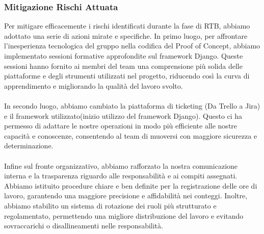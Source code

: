 \documentclass[5pt]{article}
\begin{document}
    \subsubsection{Mitigazione Rischi Attuata}
Per mitigare efficacemente i rischi identificati durante la fase di RTB, abbiamo adottato una serie di azioni mirate e specifiche. In primo luogo, per affrontare l'inesperienza tecnologica del gruppo nella codifica del Proof of Concept, abbiamo implementato sessioni formative approfondite sul framework Django. Queste sessioni hanno fornito ai membri del team una comprensione più solida delle piattaforme e degli strumenti utilizzati nel progetto, riducendo così la curva di apprendimento e migliorando la qualità del lavoro svolto.\\\\
In secondo luogo, abbiamo cambiato la piattaforma di ticketing (Da Trello a Jira) e il framework utilizzato(inizio utilizzo del framework Django). Questo ci ha permesso di adattare le nostre operazioni in modo più efficiente alle nostre capacità e conoscenze, consentendo al team di muoversi con maggiore sicurezza e determinazione.\\\\
Infine sul fronte organizzativo, abbiamo rafforzato la nostra comunicazione interna e la trasparenza riguardo alle responsabilità e ai compiti assegnati. Abbiamo istituito procedure chiare e ben definite per la registrazione delle ore di lavoro, garantendo una maggiore precisione e affidabilità nei conteggi. Inoltre, abbiamo stabilito un sistema di rotazione dei ruoli più strutturato e regolamentato, permettendo una migliore distribuzione del lavoro e evitando sovraccarichi o disallineamenti nelle responsabilità.
\end{document}

